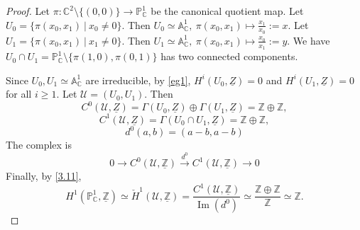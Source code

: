 \documentclass{amsart}
\numberwithin{equation}{section}
\theoremstyle{plain}
\theoremstyle{definition}
\DeclareMathOperator{\im}{Im}
\begin{document}
\begin{proof}
	Let $ \pi:\mathbb C^2\setminus\{(0,0)\}\to \mathbb P_{\mathbb C}^1 $ be the canonical quotient map. 
	Let $ U_0=\{\pi(x_0,x_1)~|~x_0\ne 0\} $. %
	Then $ U_0\simeq \mathbb A_{\mathbb C}^1 ,~\pi(x_0,x_1)\mapsto \frac{x_1}{x_0}:=x$. 
	Let $ U_1=\{\pi(x_0,x_1)~|~x_1\ne 0\} $. %
	Then $ U_1\simeq \mathbb A_{\mathbb C}^1 ,~\pi(x_0,x_1)\mapsto \frac{x_0}{x_1}:=y$. 
	We have $ U_0\cap U_1=\mathbb{P}_{\mathbb C}^1\setminus\{\pi(1,0),\pi(0,1)\} $ has two connected components. 
	
	Since $ U_0,U_1\simeq\mathbb A_{\mathbb C}^1 $ are irreducible, by \cref{eg1}, $ H^i(U_0, \underline{Z})=0 $ and $ H^i(U_1, \underline{Z})=0 $ for all $ i\ge 1 $. 
	Let $ \mathscr U=(U_0,U_1) $. 
	Then $$ C^0(\mathscr U, \underline{Z})=\Gamma(U_0, \underline{Z})\oplus \Gamma(U_1, \underline{Z})=\mathbb Z\oplus\mathbb Z,$$
	$$ C^1(\mathscr U, \underline{Z})=\Gamma(U_0\cap U_1, \underline{Z})=\mathbb Z\oplus\mathbb Z,$$
	\[d^0(a,b)=(a-b,a-b)\]
	The complex is
	\[0\to C^0(\mathscr U, \underline{\mathbb Z})\xrightarrow{d^0}C^1(\mathscr U, \underline{\mathbb Z})\to 0\]
	Finally, by \cref{3.11}, $$ H^1(\mathbb P^1_{\mathbb C}, \underline{\mathbb Z})\simeq\check H^1(\mathscr U, \underline{\mathbb Z}) =\dfrac{C^1(\mathscr U, \underline{\mathbb Z})}{\im(d^0)}\simeq\dfrac{\mathbb Z\oplus\mathbb Z}{\mathbb Z}\simeq \mathbb Z .$$
	
\end{proof}
\end{document}
